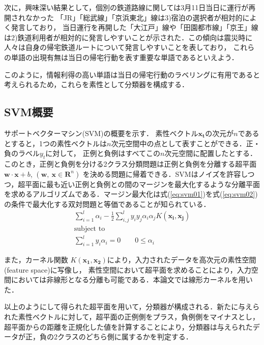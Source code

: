 \documentclass[japanese]{jnlp_1.4}
\begin{document}
次に，興味深い結果として，個別の鉄道路線に関しては3月11日当日に運行が再開されなかった
「JR」「総武線」「京浜東北」線は3)宿泊の選択者が相対的によく発言しており，
当日運行を再開した「大江戸」線や「田園都市線」「京王」線は2)鉄道利用者が相対的に発言しやすいことが示された．この傾向は震災時に人々は自身の帰宅鉄道ルートについて発言しやすいことを表しており，
これらの単語の出現有無は当日の帰宅行動を表す重要な単語であるといえよう．

このように，情報利得の高い単語は当日の帰宅行動のラベリングに有用であると考えられるため，これらを素性として分類器を構成する．



\subsection{SVM概要}

サポートベクターマシン(SVM)の概要を示す．
素性ベクトル$\boldsymbol{x_t}$の次元が$n$であるとすると，1つの素性ベクトルは$n$次元空間中の点として表すことができる．正・負のラベル$y_t$に対して，
正例と負例はすべてこの$n$次元空間に配置したとする．
このとき，正例と負例を分ける2クラス分類問題は正例と負例を分離する超平面 $\boldsymbol{w} \cdot \boldsymbol{x} + b$, $(\boldsymbol{w},\ \boldsymbol{x} \in \boldsymbol{R}^n)$ を決める問題に帰着できる．SVMはノイズを許容しつつ，超平面に最も近い正例と負例との間のマージンを最大化するような分離平面を求めるアルゴリズムである．マージン最大化は式(\ref{eq:svm01})を式(\ref{eq:svm02})の条件で最大化する双対問題と等価であることが知られている．
\begin{gather}
\sum_{i=1}^{l} \alpha_i - \frac{1}{2} \sum_{i, j}^{l} y_i y_j \alpha_i \alpha_j K(\boldsymbol{x_i}, \boldsymbol{x_j}) \label{eq:svm01} \\
\text{subject to} \nonumber\\
\sum_{i=1}^{l} y_i \alpha_i = 0 \ \ \ \ \ \ \ \ \ 0 \leq \alpha_i \label{eq:svm02}
\end{gather}

また，カーネル関数 $K(\boldsymbol{x_1}, \boldsymbol{x_2})$により，入力されたデータを高次元の素性空間 (feature space)に写像し，
素性空間において超平面を求めることにより，入力空間においては非線形となる分離も可能である．本論文では線形カーネルを用いた．

以上のようにして得られた超平面を用いて，分類器が構成される．新たに与えられた素性ベクトルに対して，超平面の正例側をプラス，負例側をマイナスとし，超平面からの距離を正規化した値を計算することにより，分類器は与えられたデータが正，負の2クラスのどちら側に属するかを判定する．
\end{document}

